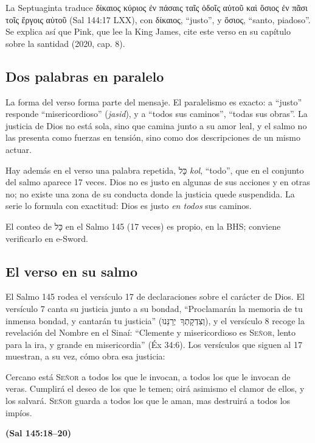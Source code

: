 \documentclass[11pt,letterpaper]{article}
\newcommand{\heb}[1]{\mbox{\foreignlanguage{hebrew}{#1}}}
\newcommand{\grc}[1]{\foreignlanguage{ancientgreek}{#1}}
\newcommand{\SENOR}{\textsc{Señor}}
\newcommand{\fuente}[1]{\par\hfill{\upshape\bfseries\small\textcolor{azul}{#1}}}
\begin{document}
La Septuaginta traduce \grc{δίκαιος κύριος ἐν πάσαις ταῖς ὁδοῖς αὐτοῦ καὶ ὅσιος ἐν πᾶσι τοῖς ἔργοις αὐτοῦ} (Sal 144:17 LXX), con \grc{δίκαιος}, ``justo'', y \grc{ὅσιος}, ``santo, piadoso''. Se explica así que Pink, que lee la King James, cite este verso en su capítulo sobre la santidad (2020, cap. 8).

\subsection{Dos palabras en paralelo}
La forma del verso forma parte del mensaje. El paralelismo es exacto: a ``justo'' responde ``misericordioso'' (\emph{jasid}), y a ``todos sus caminos'', ``todas sus obras''. La justicia de Dios no está sola, sino que camina junto a su amor leal, y el salmo no las presenta como fuerzas en tensión, sino como dos descripciones de un mismo actuar.

Hay además en el verso una palabra repetida, \heb{כָּל} \emph{kol}, ``todo'', que en el conjunto del salmo aparece 17 veces. Dios no es justo en algunas de sus acciones y en otras no; no existe una zona de su conducta donde la justicia quede suspendida. La serie lo formula con exactitud: Dios es justo \emph{en todos} sus caminos.

\begin{nota}[Precisión]
El conteo de \heb{כָּל} en el Salmo 145 (17 veces) es propio, en la BHS; conviene verificarlo en e-Sword.
\end{nota}

\subsection{El verso en su salmo}
El Salmo 145 rodea el versículo 17 de declaraciones sobre el carácter de Dios. El versículo 7 canta su justicia junto a su bondad, ``Proclamarán la memoria de tu inmensa bondad, y cantarán tu justicia'' (\heb{וְצִדְקָתְךָ יְרַנֵּנוּ}), y el versículo 8 recoge la revelación del Nombre en el Sinaí: ``Clemente y misericordioso es \SENOR, lento para la ira, y grande en misericordia'' (Éx 34:6). Los versículos que siguen al 17 muestran, a su vez, cómo obra esa justicia:

\begin{cita}Cercano está \SENOR{} a todos los que le invocan, a todos los que le invocan de veras. Cumplirá el deseo de los que le temen; oirá asimismo el clamor de ellos, y los salvará. \SENOR{} guarda a todos los que le aman, mas destruirá a todos los impíos.\fuente{(Sal 145:18--20)}\end{cita}
\end{document}
